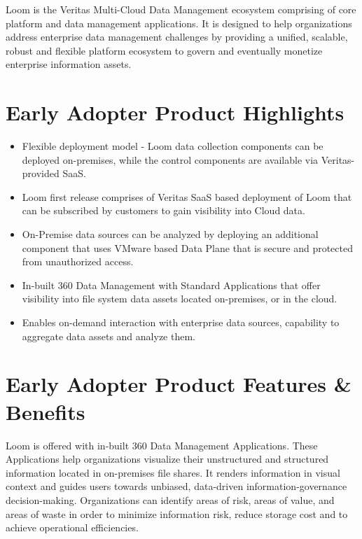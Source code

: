 \documentclass[letterpaper,10pt,english]{sphinxhowto}
\begin{document}
Loom is the Veritas Multi-Cloud Data Management ecosystem comprising of core platform and data management applications. It is designed to help organizations address enterprise data management challenges by providing a unified, scalable, robust and flexible platform ecosystem to govern and eventually monetize enterprise information assets. 


\section{Early Adopter Product Highlights}
\label{\detokenize{col/ds/mcdmp_ds_opt3:early-adopter-product-highlights}}\begin{itemize}
\item {} 
Flexible deployment model - Loom data collection components can be deployed on-premises, while the control components are available via Veritas-provided SaaS.

\item {} 
Loom first release comprises of Veritas SaaS based deployment of Loom that can be subscribed by customers to gain visibility into Cloud data.

\item {} 
On-Premise data sources can be analyzed by deploying an additional component that uses VMware based Data Plane that is secure and protected from unauthorized access.

\item {} 
In-built 360 Data Management with Standard Applications that offer visibility into file system data assets located on-premises, or in the cloud.

\item {} 
Enables on-demand interaction with enterprise data sources, capability to aggregate data assets and analyze them.

\end{itemize}


\section{Early Adopter Product Features \& Benefits}
\label{\detokenize{col/ds/mcdmp_ds_opt3:early-adopter-product-features-benefits}}
Loom is offered with in-built 360 Data Management Applications. These Applications help organizations visualize their unstructured and structured information located in on-premises file shares. It renders information in visual context and guides users towards unbiased, data-driven information-governance decision-making. Organizations can identify areas of risk, areas of value, and areas of waste in order to minimize information risk, reduce storage cost and to achieve operational efficiencies.
\end{document}
